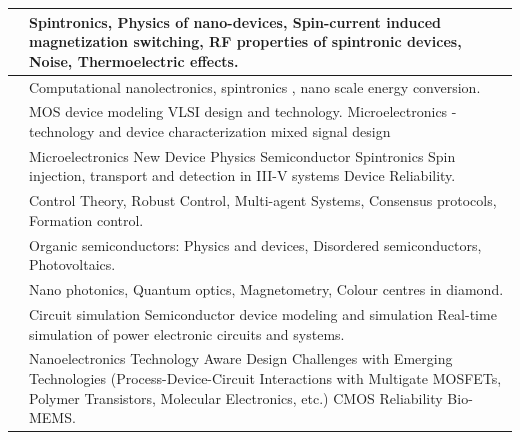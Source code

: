 \documentclass[openany]{book} %
\begin{document}
\begin{tabular}{p{4.5cm} p{9cm}}
\hline
\href{https://www.ee.iitb.ac.in/web/people/faculty/home/ashwin}{\color{blue}{Prof. Ashwin A. Tulapurkar}} & Spintronics, Physics of nano-devices, Spin-current induced magnetization switching, RF properties of spintronic devices, Noise, Thermoelectric effects.\\
\hline

\href{https://www.ee.iitb.ac.in/web/people/faculty/home/bm}{\color{blue}{Prof. Bhaskaran Muralidharan}} & Computational nanolectronics, spintronics , nano scale energy conversion.\\
\hline

\href{https://www.ee.iitb.ac.in/wiki/faculty/dinesh}{\color{blue}{Prof. Dinesh K. Sharma}} & MOS device modeling VLSI design and technology. Microelectronics - technology and device characterization mixed signal design \\
\hline

\href{https://www.ee.iitb.ac.in/web/people/faculty/home/dsaha}{\color{blue}{Prof. Dipankar Saha}} & Microelectronics New Device Physics Semiconductor Spintronics Spin injection, transport and detection in III-V systems Device Reliability.\\
\hline

\href{https://www.ee.iitb.ac.in/web/people/faculty/home/dm}{\color{blue}{Prof. Dwaipayan Mukherjee}} & Control Theory, Robust Control, Multi-agent Systems, Consensus protocols, Formation control.\\
\hline

\href{https://www.ee.iitb.ac.in/web/people/faculty/home/kln}{\color{blue}{Prof. K. L. Narasimhan}} & Organic semiconductors: Physics and devices, Disordered semiconductors, Photovoltaics.\\
\hline

\href{https://www.ee.iitb.ac.in/web/people/faculty/home/kasturis}{\color{blue}{Prof. Kasturi Saha}} & Nano photonics, Quantum optics, Magnetometry, Colour centres in diamond.\\
\hline

\href{https://www.ee.iitb.ac.in/web/people/faculty/home/mbpatil}{\color{blue}{Prof. Mahesh B. Patil}} & Circuit simulation Semiconductor device modeling and simulation Real-time simulation of power electronic circuits and systems.\\
\hline

\href{https://www.ee.iitb.ac.in/~rrao/}{\color{blue}{Prof. Valipe Ramgopal Rao}} & Nanoelectronics Technology Aware Design Challenges with Emerging Technologies (Process-Device-Circuit Interactions with Multigate MOSFETs, Polymer Transistors, Molecular Electronics, etc.) CMOS Reliability Bio-MEMS.\\
\hline


\end{tabular}
\end{document}
